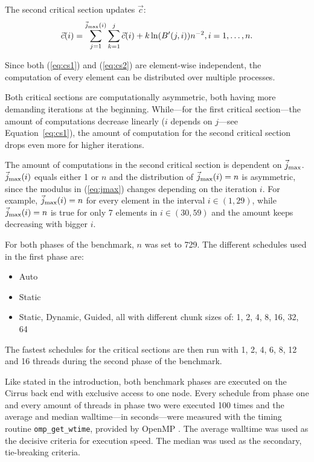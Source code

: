 \documentclass[twoside,11pt]{article}
\begin{document}
The second critical section updates $\vec{c}$:
\begin{align}
  \label{eq:cs2}
  \vec{c}(i) = \sum_{j=1}^{\vec{j}_{\text{max} }(i)}\sum_{k=1}^{j}
    \vec{c}(i) + k\ln(B'(j, i))n^{-2}, i=1,\dots,n.
\end{align}

Since both (\ref{eq:cs1}) and (\ref{eq:cs2}) are
element-wise independent, the computation of every element
can be distributed over multiple processes.

Both critical sections are computationally asymmetric, both
having more demanding iterations at the beginning.
While---for the first critical section---the amount of
computations decrease linearly ($i$ depends on $j$---see
Equation~\ref{eq:cs1}), the amount of computation for the
second critical section drops even more for higher
iterations.

The amount of computations in the second critical section
is dependent on $\vec{j}_{\text{max} }$.
$\vec{j}_{\text{max} }(i)$ equals either 1 or $n$ and the
distribution of $\vec{j}_{\text{max} }(i) = n$ is asymmetric, since
the modulus in (\ref{eq:jmax}) changes depending on the
iteration $i$.
For example, $\vec{j}_{\text{max} }(i) = n$ for every element in the
interval $i \in (1, 29)$, while $\vec{j}_{\text{max} }(i) = n$ is true for
only 7 elements in $i \in (30, 59)$ and the amount keeps
decreasing with bigger $i$.

For both phases of the benchmark, $n$ was set to 729.
The different schedules used in the first phase
are:
\begin{itemize}
  \item Auto
  \item Static
  \item Static, Dynamic, Guided, all with different
    chunk sizes of: 1, 2, 4, 8, 16, 32, 64
\end{itemize}

The fastest schedules for the critical sections
are then run with 1, 2, 4, 6, 8, 12 and 16 threads during
the second phase of the benchmark.

Like stated in the introduction, both benchmark phases are
executed on the Cirrus back end with exclusive access to
one node.
Every schedule from phase one and every amount of
threads in phase two were executed 100 times and the
average and median walltime---in seconds---were measured
with the timing routine \texttt{omp\_get\_wtime}, provided
by OpenMP \citep[see][Chapter 3.4.1]{openmp}.
The average walltime was used as the decisive criteria for
execution speed.
The median was used as the secondary, tie-breaking
criteria.
\end{document}

